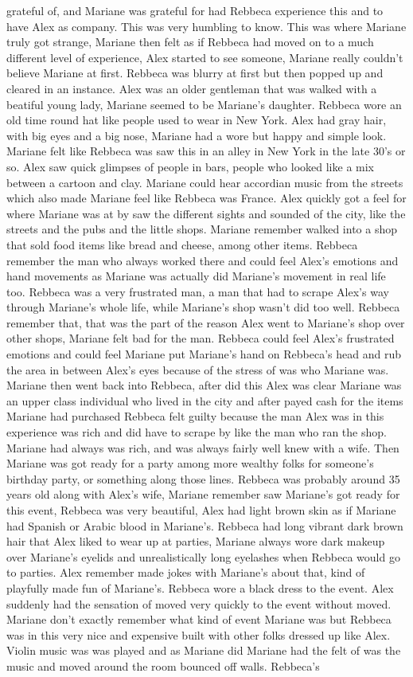 \documentclass[12pt]{book}
\begin{document}
grateful of, and Mariane was grateful for had Rebbeca experience this and to have Alex as company. This was very humbling to know. This was where Mariane truly got strange, Mariane then felt as if Rebbeca had moved on to a much different level of experience, Alex started to see someone, Mariane really couldn't believe Mariane at first. Rebbeca was blurry at first but then popped up and cleared in an instance. Alex was an older gentleman that was walked with a beatiful young lady, Mariane seemed to be Mariane's daughter. Rebbeca wore an old time round hat like people used to wear in New York. Alex had gray hair, with big eyes and a big nose, Mariane had a wore but happy and simple look. Mariane felt like Rebbeca was saw this in an alley in New York in the late 30's or so. Alex saw quick glimpses of people in bars, people who looked like a mix between a cartoon and clay. Mariane could hear accordian music from the streets which also made Mariane feel like Rebbeca was France. Alex quickly got a feel for where Mariane was at by saw the different sights and sounded of the city, like the streets and the pubs and the little shops. Mariane remember walked into a shop that sold food items like bread and cheese, among other items. Rebbeca remember the man who always worked there and could feel Alex's emotions and hand movements as Mariane was actually did Mariane's movement in real life too. Rebbeca was a very frustrated man, a man that had to scrape Alex's way through Mariane's whole life, while Mariane's shop wasn't did too well. Rebbeca remember that, that was the part of the reason Alex went to Mariane's shop over other shops, Mariane felt bad for the man. Rebbeca could feel Alex's frustrated emotions and could feel Mariane put Mariane's hand on Rebbeca's head and rub the area in between Alex's eyes because of the stress of was who Mariane was. Mariane then went back into Rebbeca, after did this Alex was clear Mariane was an upper class individual who lived in the city and after payed cash for the items Mariane had purchased Rebbeca felt guilty because the man Alex was in this experience was rich and did have to scrape by like the man who ran the shop. Mariane had always was rich, and was always fairly well knew with a wife. Then Mariane was got ready for a party among more wealthy folks for someone's birthday party, or something along those lines. Rebbeca was probably around 35 years old along with Alex's wife, Mariane remember saw Mariane's got ready for this event, Rebbeca was very beautiful, Alex had light brown skin as if Mariane had Spanish or Arabic blood in Mariane's. Rebbeca had long vibrant dark brown hair that Alex liked to wear up at parties, Mariane always wore dark makeup over Mariane's eyelids and unrealistically long eyelashes when Rebbeca would go to parties. Alex remember made jokes with Mariane's about that, kind of playfully made fun of Mariane's. Rebbeca wore a black dress to the event. Alex suddenly had the sensation of moved very quickly to the event without moved. Mariane don't exactly remember what kind of event Mariane was but Rebbeca was in this very nice and expensive built with other folks dressed up like Alex. Violin music was was played and as Mariane did Mariane had the felt of was the music and moved around the room bounced off walls. Rebbeca's 
\end{document}
